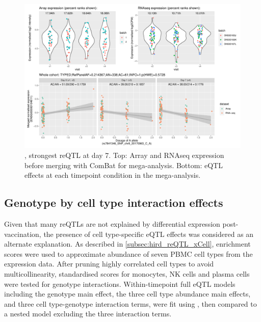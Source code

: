 \begin{figure}
    \centering
    \includegraphics[width=1.0\textwidth,page=1]{mainmatter/figures/chapter_03/plot_dge_eqtl_genotypes.ENSG00000104611,rs7841346_SNP_chr8_20170963_C_A.pdf}
    \caption{, strongest reQTL at day 7. Top: Array and \gls{RNAseq} expression before merging with ComBat for mega-analysis. Bottom: eQTL effects at each timepoint condition in the mega-analysis.}
    \label{fig:hird_eQTL_ploteQTL_SH2D4A}
\end{figure}

\subsection{Genotype by cell type interaction effects}

Given that many \glspl{reQTL} are not explained by differential expression post-vaccination, the presence of cell type-specific \gls{eQTL} effects was considered as an alternate explanation.
As described in \autoref{subsec:hird_reQTL_xCell},  enrichment scores were used to approximate abundance of seven \gls{PBMC} cell types from the expression data.
After pruning highly correlated cell types to avoid multicollinearity, standardised scores for monocytes, \gls{NK} cells and plasma cells were tested for genotype interactions.
Within-timepoint full \gls{eQTL} models including the genotype main effect, the three cell type abundance main effects, and three cell type-genotype interaction terms, were fit using , 
then compared to a nested model excluding the three interaction terms.

